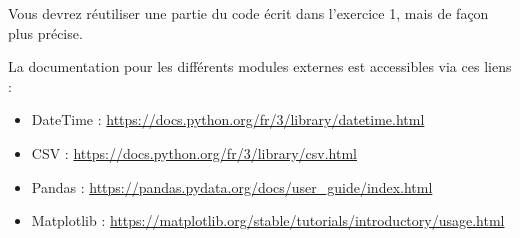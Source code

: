 

\vspace*{0.7cm}

\noindent {}

\bigskip

\noindent Vous devrez réutiliser une partie du code écrit dans l'exercice 1, mais de façon plus précise.

\bigskip

\noindent La documentation pour les différents modules externes est accessibles via ces liens :

\begin{itemize}
\item DateTime : \url{https://docs.python.org/fr/3/library/datetime.html}
\item CSV : \url{https://docs.python.org/fr/3/library/csv.html}
\item Pandas : \url{https://pandas.pydata.org/docs/user\_guide/index.html}
\item Matplotlib : \url{https://matplotlib.org/stable/tutorials/introductory/usage.html}
\end{itemize}

\bigskip

